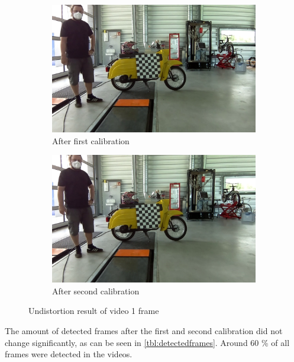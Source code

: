\begin{figure}[h]
    \centering
    \begin{subfigure}[b]{0.48\textwidth}
        \centering
        \includegraphics[width=\textwidth]{figures/video1_und1_20+20.png}
        \caption{After first calibration}
    \end{subfigure}
    \hfill
    \begin{subfigure}[b]{0.48\textwidth}
        \centering
        \includegraphics[width=\textwidth]{figures/video1_und2.png}
        \caption{After second calibration}
    \end{subfigure}
    \caption{Undistortion result of video 1 frame}
    \label{fig:undist_2cal}
\end{figure}

The amount of detected frames after the first and second calibration did not change significantly, as can be seen in \autoref{tbl:detectedframes}. Around 60 \% of all frames were detected in the videos.


